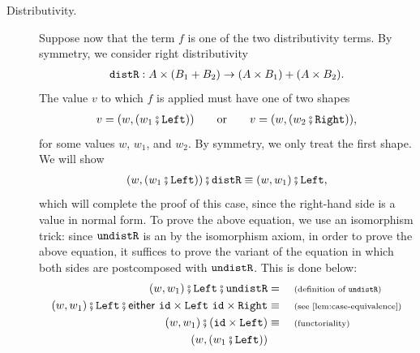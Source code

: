 \begin{description}
    \item[Distributivity.] Suppose now that the term $f$ is one of the two  distributivity terms. By symmetry, we consider  right distributivity
    \begin{align*}
    \mathtt{distR} : A \times (B_1 + B_2) \to (A \times B_1) + (A \times B_2).
    \end{align*}
    The value  $v$ to which $f$ is applied  must have one of two shapes
    \begin{align*}
   v=  (w, (w_1\comp\leftterm)) \qquad \text{or} \qquad v= (w, (w_2\comp\rightterm)),
    \end{align*}
    for some values $w$, $w_1$, and $w_2$. 
    By symmetry, we only treat the first shape.  We will  show
    \begin{align*}
    (w, (w_1\comp\leftterm))\comp \distrterm  \equiv  (w,w_1)\comp \leftterm,
    \end{align*}
    which will complete the proof of this case, since the right-hand side is a value in normal form.
    To prove the above equation, we use an isomorphism trick: since $\mathtt{undistR}$ is an  by the isomorphism axiom, in order to prove the above equation, it suffices to prove the variant of the equation in which both sides are postcomposed with $\mathtt{undistR}$. This is done below:
    \begin{align*}
        (w,w_1)\comp \leftterm\comp \undistrterm &= \why{definition of $\undistrterm$} \\
    (w,w_1)\comp \leftterm\comp \either{\idterm \times \leftterm}{\idterm \times \rightterm} \equalbecause{see \cref{lem:case-equivalence}}\\ 
    (w,w_1)\comp (\idterm \times \leftterm) \equalbecause{functoriality} \\
    (w, (w_1\comp\leftterm))
    \end{align*}




\end{description}
